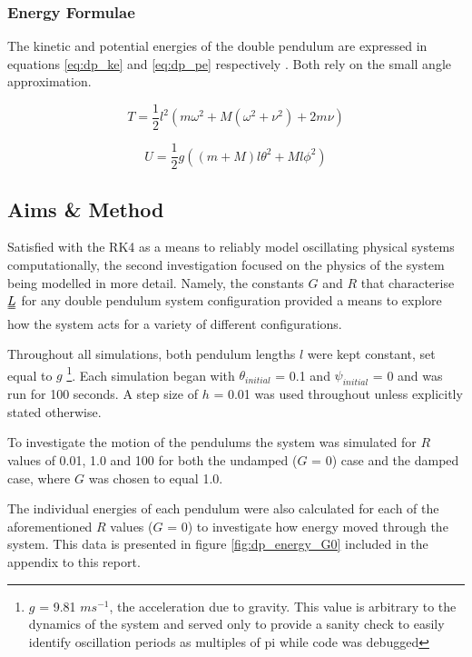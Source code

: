 \documentclass[11pt]{article}
\begin{document}
\subsubsection*{Energy Formulae}
The kinetic and potential energies of the double pendulum are expressed in equations \ref{eq:dp_ke} and \ref{eq:dp_pe} respectively \cite{dp energy formulae}. Both rely on the small angle approximation.

\begin{equation} \label{eq:dp_ke}
T = \frac{1}{2}l^2\left(m\omega^2 + M(\omega^2 + \nu^2) + 2m\nu \right)
\end{equation}

\begin{equation} \label{eq:dp_pe}
U = \frac{1}{2}g\left((m+M)l\theta^2 + Ml\phi^2 \right)
\end{equation}

\subsection{Aims \& Method}
Satisfied with the RK4 as a means to reliably model oscillating physical systems computationally, the second investigation focused on the physics of the system being modelled in more detail. Namely, the constants $G$ and $R$ that characterise $\uuline{L}$ for any double pendulum system configuration provided a means to explore how the system acts for a variety of different configurations.

Throughout all simulations, both pendulum lengths $l$ were kept constant, set equal to $g$ \footnote{$g$ = 9.81 $ms^{-1}$, the acceleration due to gravity. This value is arbitrary to the dynamics of the system and served only to provide a sanity check to easily identify oscillation periods as multiples of pi while code was debugged}. Each simulation began with $\theta_{initial}$ = 0.1 and $\psi_{initial}$ = 0 and was run for 100 seconds. A step size of $h$ = 0.01 was used throughout unless explicitly stated otherwise.

To investigate the motion of the pendulums the system was simulated for $R$ values of 0.01, 1.0 and 100 for both the undamped ($G$ = 0) case and the damped case, where $G$ was chosen to equal 1.0.

The individual energies of each pendulum were also calculated for each of the aforementioned $R$  values ($G$ = 0) to investigate how energy moved through the system. This data is presented in figure \ref{fig:dp_energy_G0} included in the appendix to this report.
\end{document}
